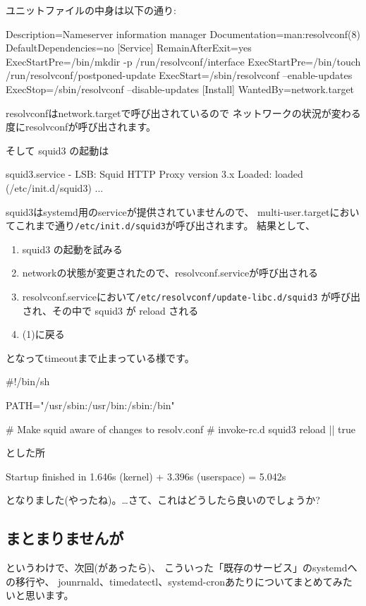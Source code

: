 \documentclass[mingoth,a4paper]{jsarticle}
\begin{document}
ユニットファイルの中身は以下の通り:
\begin{commandline}
[Unit]
Description=Nameserver information manager
Documentation=man:resolvconf(8)
DefaultDependencies=no
[Service]
RemainAfterExit=yes
ExecStartPre=/bin/mkdir -p /run/resolvconf/interface
ExecStartPre=/bin/touch /run/resolvconf/postponed-update
ExecStart=/sbin/resolvconf --enable-updates
ExecStop=/sbin/resolvconf --disable-updates
[Install]
WantedBy=network.target
\end{commandline}
\noindent
resolvconfはnetwork.targetで呼び出されているので
ネットワークの状況が変わる度にresolvconfが呼び出されます。

そして squid3 の起動は
\begin{commandline}
squid3.service - LSB: Squid HTTP Proxy version 3.x
   Loaded: loaded (/etc/init.d/squid3)
   ...
\end{commandline}
squid3はsystemd用のserviceが提供されていませんので、
multi-user.targetにおいてこれまで通り\texttt{/etc/init.d/squid3}が呼び出されます。
結果として、
\begin{enumerate}[topsep=1zw,label=(\arabic*)]
\item squid3 の起動を試みる
\item networkの状態が変更されたので、resolvconf.serviceが呼び出される
\item resolvconf.serviceにおいて\texttt{/etc/resolvconf/update-libc.d/squid3} が呼び出され、その中で squid3 が reload される
\item (1)に戻る
\end{enumerate}
となってtimeoutまで止まっている様です。
\begin{commandline}
#!/bin/sh

PATH="/usr/sbin:/usr/bin:/sbin:/bin"

# Make squid aware of changes to resolv.conf
# invoke-rc.d squid3 reload || true
\end{commandline}
とした所
\begin{commandline}
Startup finished in 1.646s (kernel) + 3.396s (userspace) = 5.042s
\end{commandline}
となりました(やったね)。…さて、これはどうしたら良いのでしょうか?

\subsection{まとまりませんが}

というわけで、次回(があったら)、
こういった「既存のサービス」のsystemdへの移行や、
jounrnald、timedatectl、systemd-cronあたりについてまとめてみたいと思います。
\end{document}
